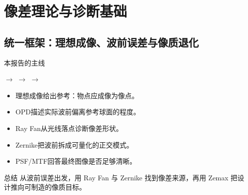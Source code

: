 \section{像差理论与诊断基础}
\label{chap:1}

\subsection{统一框架：理想成像、波前误差与像质退化}
\label{sec:1.1}

\begin{frame}{本报告的主线}
\label{1.1}
        \begin{center}
            \quad
            $\rightarrow$\quad
            \quad
            $\rightarrow$\quad
            \quad
            $\rightarrow$\quad
        \end{center}

        \bigbreak
        \begin{itemize}
            \item \alert{理想成像}给出参考：物点应成像为像点。
            \item \alert{OPD}描述实际波前偏离参考球面的程度。
            \item \alert{Ray Fan}从光线落点诊断像差形状。
            \item \alert{Zernike}把波前拆成可量化的正交模式。
            \item \alert{PSF/MTF}回答最终图像是否足够清晰。
        \end{itemize}
        \hfil
        \begin{alertblock}{总结}
            从波前误差出发，用 Ray Fan 与 Zernike 找到像差来源，再用 Zemax 把设计推向可制造的像质目标。
        \end{alertblock}
\end{frame}

